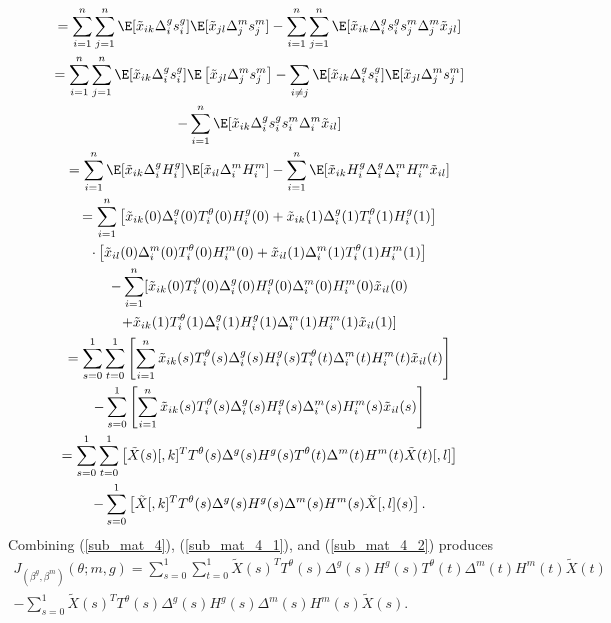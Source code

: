 \documentclass[11pt]{article}
\begin{document}
\begin{appendices}
\begin{refsection}
\begin{multline}
= \sum_{i=1}^n \sum_{j=1}^n \E[\tilde{x}_{ik} \Delta^g_is^g_i] \E[ \tilde{x}_{jl} \Delta^m_j s^m_j ] - \sum_{i=1}^n \sum_{j=1}^n \E[ \tilde{x}_{ik} \Delta^g_i s^g_i s^m_j \Delta^m_j \tilde{x}_{jl}]  \\
= \sum_{i=1}^n \sum_{j=1}^n \E[ \tilde{x}_{ik} \Delta^g_i s^g_i] \E \left[\tilde{x}_{jl} \Delta^m_j s^m_j \right]  - \sum_{i \neq j} \E[\tilde{x}_{ik} \Delta^g_i s^g_i] \E[\tilde{x}_{jl}\Delta^m_j  s^m_j ] \\ - \sum_{i=1}^n \E[\tilde{x}_{ik} \Delta^g_i s^g_i s^m_i \Delta^m_i \tilde{x}_{il}] \\
= \sum_{i=1}^n \E[\tilde{x}_{ik} \Delta^g_i H^g_i] \E[\tilde{x}_{il} \Delta_i^m H^m_i] - \sum_{i=1}^n \E[\tilde{x}_{ik} H_i^g \Delta_i^g \Delta_i^m H_i^m \tilde{x}_{il}] \\ 
= \sum_{i=1}^n \left[\tilde{x}_{ik}(0) {\Delta}^g_i(0) T^\theta_i(0) {H}^g_i(0) + \tilde{x}_{ik}(1) {\Delta}^g_i(1) T^\theta_i(1) {H}^g_i(1)\right] \\ 
\cdot \left[\tilde{x}_{il}(0) {\Delta}^m_i(0) T^\theta_i(0) {H}^m_i(0) + \tilde{x}_{il}(1) {\Delta}^m_i(1) T^\theta_i(1) {H}^m_i(1)\right] 
\\ - \sum_{i=1}^n [\tilde{x}_{ik}(0) T^\theta_i(0) {\Delta}^g_i(0) {H}^g_i(0) {\Delta}^m_i(0) {H}^m_i(0) \tilde{x}_{il}(0) \\ + \tilde{x}_{ik}(1) T^\theta_i(1) {\Delta}^g_i(1) {H}^g_i(1) {\Delta}^m_i(1) {H}^m_i(1) \tilde{x}_{il}(1) ] 
\\ = \sum_{s=0}^1 \sum_{t=0}^1 \left[\sum_{i=1}^n \tilde{x}_{ik}(s) T^\theta_i(s) {\Delta}^g_i(s) {H}^g_i(s) T^\theta_i(t){\Delta}^m_i(t) {H}^m_i(t) \tilde{x}_{il}(t) \right]
\\ - \sum_{s=0}^1 \left[\sum_{i=1}^n \tilde{x}_{ik}(s) T^\theta_i(s) {\Delta}^g_i(s) {H}^g_i(s) {\Delta}^m_i(s) {H}^m_i(s) \tilde{x}_{il}(s)\right] 
\\ = \sum_{s=0}^1 \sum_{t=0}^1 \left[ \tilde{X}(s)[,k]^T T^\theta(s) {\Delta}^g(s) {H}^g(s) T^\theta(t){\Delta}^m(t) {H}^m(t) \tilde{X}(t)[,l] \right]\\ - \sum_{s=0}^1 \left[ \tilde{X}[,k]^T T^\theta(s) {\Delta}^g(s) {H}^g(s) {\Delta}^m(s) {H}^m(s) \tilde{X}[,l](s)\right].
\end{multline}
Combining (\ref{sub_mat_4}), (\ref{sub_mat_4_1}), and (\ref{sub_mat_4_2}) produces
\begin{multline}\label{sub_mat_4_formula}
J_{(\beta^g, \beta^m)}(\theta; m, g) = \sum_{s=0}^1 \sum_{t=0}^1 \tilde{X}(s)^T  T^\theta(s) {\Delta}^g(s) {H}^g(s) T^\theta(t){\Delta}^m(t) {H}^m(t) \tilde{X}(t) \\ - \sum_{s=0}^1 \tilde{X}(s)^T T^\theta(s) {\Delta}^g(s) {H}^g(s) {\Delta}^m(s) {H}^m(s) \tilde{X}(s).
\end{multline}

\end{refsection}
\end{appendices}
\end{document}
